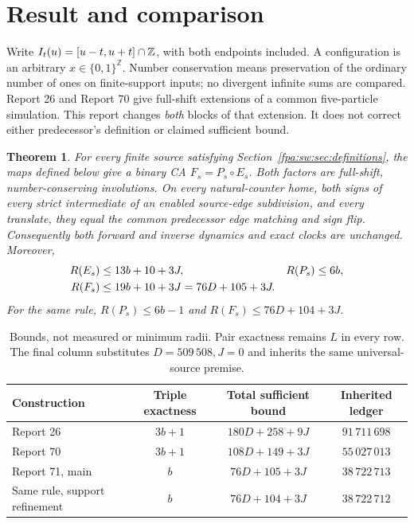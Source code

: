 \documentclass[11pt,a4paper]{article}
\numberwithin{equation}{section}
\newtheorem{theorem}{Theorem}[section]
\newcommand{\X}{\{0,1\}^{\mathbb Z}}\newcommand{\id}{\operatorname{id}}
\newcommand{\Es}{E_s}\newcommand{\Ps}{P_s}\newcommand{\Fs}{F_s}\newcommand{\Cand}{\mathcal C_P}
\begin{document}
\section{Result and comparison}\label{fpa:rep:71:first}\label{fpa:sw:sec:result}
Write $I_t(u)=[u-t,u+t]\cap\mathbb Z$, with both endpoints included. A configuration is an arbitrary $x\in\X$. Number conservation means preservation of the ordinary number of ones on finite-support inputs; no divergent infinite sums are compared. Report 26 and Report 70 give full-shift extensions of a common five-particle simulation. This report changes \emph{both} blocks of that extension. It does not correct either predecessor's definition or claimed sufficient bound.

\begin{theorem}\label{fpa:sw:thm:main}
For every finite source satisfying Section~\ref{fpa:sw:sec:definitions}, the maps defined below give a binary CA $\Fs=\Ps\circ\Es$. Both factors are full-shift, number-conserving involutions. On every natural-counter home, both signs of every strict intermediate of an enabled source-edge subdivision, and every translate, they equal the common predecessor edge matching and sign flip. Consequently both forward and inverse dynamics and exact clocks are unchanged. Moreover,
\begin{align}
R(\Es)&\le13b+10+3J,&R(\Ps)&\le6b,\notag\\
R(\Fs)&\le19b+10+3J=76D+105+3J.\label{fpa:sw:eq:main}
\end{align}
For the same rule, $R(\Ps)\le6b-1$ and $R(\Fs)\le76D+104+3J$.
\end{theorem}

\begin{table}[htbp]\centering\small
\begin{tabular}{lccc}\toprule
Construction & Triple exactness & Total sufficient bound & Inherited ledger\\\midrule
Report 26 & $3b+1$ & $180D+258+9J$ & $91\,711\,698$\\
Report 70 & $3b+1$ & $108D+149+3J$ & $55\,027\,013$\\
Report 71, main & $b$ & $76D+105+3J$ & $38\,722\,713$\\
Same rule, support refinement & $b$ & $76D+104+3J$ & $38\,722\,712$\\\bottomrule
\end{tabular}
\caption{Bounds, not measured or minimum radii. Pair exactness remains $L$ in every row. The final column substitutes $D=509\,508,J=0$ and inherits the same universal-source premise.}
\label{fpa:sw:tab:comparison}
\end{table}
\end{document}
